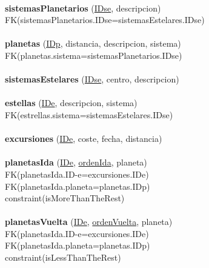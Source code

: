\documentclass[a4paper,10pt]{article}
\newcommand\tab[1][1cm]{\hspace*{#1}}
\begin{document}
\paragraph{}
{\bf sistemasPlanetarios} (\underline{IDse}, descripcion)\\
\tab FK(sistemasPlanetarios.IDse=sistemasEstelares.IDse)

\paragraph{}
{\bf planetas} (\underline{IDp}, distancia, descripcion, sistema)\\
\tab FK(planetas.sistema=sistemasPlanetarios.IDse)

\paragraph{}
{\bf sistemasEstelares} (\underline{IDse}, centro, descripcion)

\paragraph{}
{\bf estellas} (\underline{IDe}, descripcion, sistema)\\
\tab FK(estrellas.sistema=sistemasEstelares.IDse)

\paragraph{}
{\bf excursiones} (\underline{IDe}, coste, fecha, distancia)

\paragraph{}
{\bf planetasIda} (\underline{IDe}, \underline{ordenIda}, planeta)\\
\tab FK(planetasIda.ID-e=excursiones.IDe)\\
\tab FK(planetasIda.planeta=planetas.IDp)\\
\tab constraint(isMoreThanTheRest)

\paragraph{}
{\bf planetasVuelta} (\underline{IDe}, \underline{ordenVuelta}, planeta)\\
\tab FK(planetasIda.ID-e=excursiones.IDe)\\
\tab FK(planetasIda.planeta=planetas.IDp)\\
\tab constraint(isLessThanTheRest)
\end{document}
